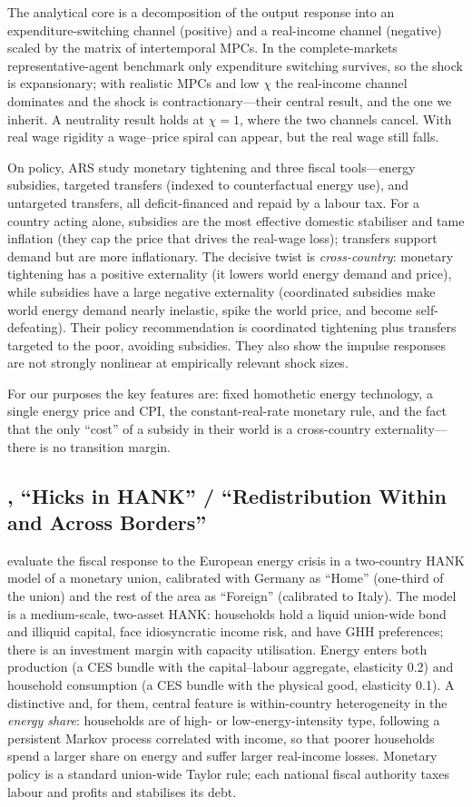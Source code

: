 \documentclass[11pt,a4paper]{article}
\begin{document}
The analytical core is a decomposition of the output response into an
expenditure-switching channel (positive) and a real-income channel (negative)
scaled by the matrix of intertemporal MPCs. In the complete-markets
representative-agent benchmark only expenditure switching survives, so the
shock is expansionary; with realistic MPCs and low $\chi$ the real-income
channel dominates and the shock is contractionary---their central result, and
the one we inherit. A neutrality result holds at $\chi=1$, where the two
channels cancel. With real wage rigidity a wage--price spiral can appear, but
the real wage still falls.

On policy, ARS study monetary tightening and three fiscal tools---energy
subsidies, targeted transfers (indexed to counterfactual energy use), and
untargeted transfers, all deficit-financed and repaid by a labour tax. For a
country acting alone, subsidies are the most effective domestic stabiliser and
tame inflation (they cap the price that drives the real-wage loss); transfers
support demand but are more inflationary. The decisive twist is
\emph{cross-country}: monetary tightening has a positive externality (it lowers
world energy demand and price), while subsidies have a large negative
externality (coordinated subsidies make world energy demand nearly inelastic,
spike the world price, and become self-defeating). Their policy recommendation
is coordinated tightening plus transfers targeted to the poor, avoiding
subsidies. They also show the impulse responses are not strongly nonlinear at
empirically relevant shock sizes.

For our purposes the key features are: fixed homothetic energy technology, a
single energy price and CPI, the constant-real-rate monetary rule, and the fact
that the only ``cost'' of a subsidy in their world is a cross-country
externality---there is no transition margin.

\subsection{\citet{Bayer2026}, ``Hicks in HANK'' / ``Redistribution Within and
Across Borders''}

\citet{Bayer2026} evaluate the fiscal response to the European energy crisis in
a two-country HANK model of a monetary union, calibrated with Germany as
``Home'' (one-third of the union) and the rest of the area as ``Foreign''
(calibrated to Italy). The model is a medium-scale, two-asset HANK: households
hold a liquid union-wide bond and illiquid capital, face idiosyncratic income
risk, and have GHH preferences; there is an investment margin with capacity
utilisation. Energy enters both production (a CES bundle with the
capital--labour aggregate, elasticity 0.2) and household consumption (a CES
bundle with the physical good, elasticity 0.1). A distinctive and, for them,
central feature is within-country heterogeneity in the \emph{energy share}:
households are of high- or low-energy-intensity type, following a persistent
Markov process correlated with income, so that poorer households spend a larger
share on energy and suffer larger real-income losses. Monetary policy is a
standard union-wide Taylor rule; each national fiscal authority taxes labour
and profits and stabilises its debt.
\end{document}
